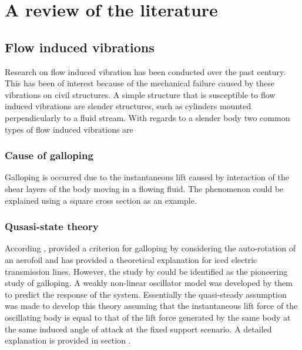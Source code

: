 \chapter{A review of the literature}

\section{Flow induced vibrations}

Research on flow induced vibration has been conducted over the past century. This has been of interest because of the mechanical failure caused by these vibrations on civil structures. A simple structure that is susceptible to flow induced vibrations are slender structures, such as cylinders mounted perpendicularly to a fluid stream. With regards to a slender body two common types of flow induced vibrations are


\subsection{Cause of galloping}
Galloping is occurred due to the instantaneous lift caused by interaction of the shear layers of the body moving in a flowing fluid. The phenomenon could be explained using a square cross section as an example. 

\subsection{Qusasi-state theory}

According \cite{Paidoussis2010}, \cite{Glauert1919} provided a criterion for galloping by considering the auto-rotation of an aerofoil and \cite{DenHartog1956} has provided a theoretical explanation for iced electric transmission lines. However, the study by \cite{Parkinson1964} could be identified as the pioneering study of galloping. A weakly non-linear oscillator model was developed by them to predict the response of the system. Essentially the quasi-steady assumption was made to develop this theory assuming that the instantaneous lift force of the oscillating body is equal to that of the lift force generated by the same body at the same induced angle of attack at the fixed support scenario. A detailed explanation is provided in section .

